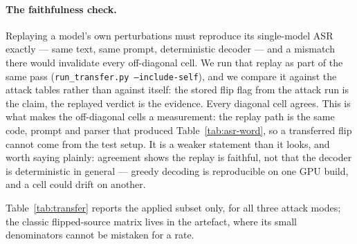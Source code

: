 \paragraph{The faithfulness check.} Replaying a model's own perturbations must
reproduce its single-model ASR exactly --- same text, same prompt, deterministic
decoder --- and a mismatch there would invalidate every off-diagonal cell. We run
that replay as part of the same pass (\texttt{run\_transfer.py --include-self}),
and we compare it against the attack tables rather than against itself: the
stored flip flag from the attack run is the claim, the replayed verdict is the
evidence. Every diagonal cell agrees. This is what makes the off-diagonal cells a
measurement: the replay path is the same code, prompt and parser that produced
Table~\ref{tab:asr-word}, so a transferred flip cannot come from the test setup.
It is a weaker statement than it looks, and worth saying plainly: agreement shows
the replay is faithful, not that the decoder is deterministic in general ---
greedy decoding is reproducible on one GPU build, and a cell could drift on
another.


Table~\ref{tab:transfer} reports the applied subset only, for all three attack
modes; the classic flipped-source matrix lives in the artefact, where its small
denominators cannot be mistaken for a rate.


